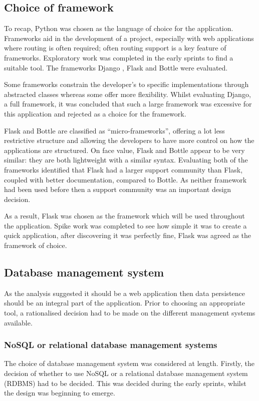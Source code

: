 \subsection{Choice of framework}
To recap, Python was chosen as the language of choice for the application. Frameworks aid in the development of a project, especially with web applications where routing is often required; often routing support is a key feature of frameworks. Exploratory work was completed in the early sprints to find a suitable tool. The frameworks Django \cite{citeulike:14019784}, Flask \cite{citeulike:13160396} and Bottle \cite{citeulike:14019792} were evaluated.

Some frameworks constrain the developer's to specific implementations through abstracted classes whereas some offer more flexibility. Whilst evaluating Django, a full framework, it was concluded that such a large framework was excessive for this application and rejected as a choice for the framework.

Flask and Bottle are classified as ``micro-frameworks'', offering a lot less restrictive structure and allowing the developers to have more control on how the applications are structured. On face value, Flask and Bottle appear to be very similar: they are both lightweight with a similar syntax. Evaluating both of the frameworks identified that Flask had a larger support community than Flask, coupled with better documentation, compared to Bottle. As neither framework had been used before then a support community was an important design decision.

As a result, Flask was chosen as the framework which will be used throughout the application. Spike work was completed to see how simple it was to create a quick application, after discovering it was perfectly fine, Flask was agreed as the framework of choice.

\subsection{Database management system}
As the analysis suggested it should be a web application then data persistence should be an integral part of the application. Prior to choosing an appropriate tool, a rationalised decision had to be made on the different management systems available.

\subsubsection{NoSQL or relational database management systems}
The choice of database management system was considered at length. Firstly, the decision of whether to use NoSQL or a relational database management system (RDBMS) had to be decided. This was decided during the early sprints, whilst the design was beginning to emerge.

